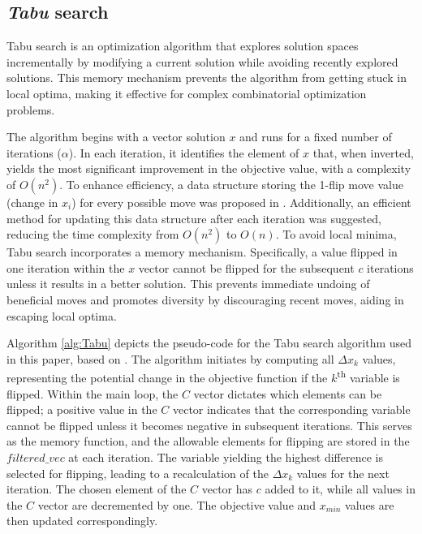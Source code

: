 \vspace{-8pt}
\subsection{\textit{Tabu} search}
Tabu search is an optimization algorithm that explores solution spaces incrementally by modifying a current solution while avoiding recently explored solutions. This memory mechanism prevents the algorithm from getting stuck in local optima, making it effective for complex combinatorial optimization problems. 

The algorithm begins with a vector solution $x$ and runs for a fixed number of iterations ($\alpha$). In each iteration, it identifies the element of $x$ that, when inverted, yields the most significant improvement in the objective value, with a complexity of $O(n^2)$. To enhance efficiency, a data structure storing the 1-flip move value (change in $x_i$) for every possible move was proposed in \cite{ref1}. Additionally, an efficient method for updating this data structure after each iteration was suggested, reducing the time complexity from $O(n^2)$ to $O(n)$. To avoid local minima, Tabu search incorporates a memory mechanism. Specifically, a value flipped in one iteration within the $x$ vector cannot be flipped for the subsequent $c$ iterations unless it results in a better solution. This prevents immediate undoing of beneficial moves and promotes diversity by discouraging recent moves, aiding in escaping local optima.

Algorithm \ref{alg:Tabu} depicts the pseudo-code for the Tabu search algorithm used in this paper, based on \cite{ref1}. The algorithm initiates by computing all $\Delta x_{k}$ values, representing the potential change in the objective function if the $k$\textsuperscript{th} variable is flipped. Within the main loop, the $C$ vector dictates which elements can be flipped; a positive value in the $C$ vector indicates that the corresponding variable cannot be flipped unless it becomes negative in subsequent iterations. This serves as the memory function, and the allowable elements for flipping are stored in the $filtered\_vec$ at each iteration. The variable yielding the highest difference is selected for flipping, leading to a recalculation of the $\Delta x_{k}$ values for the next iteration. The chosen element of the $C$ vector has $c$ added to it, while all values in the $C$ vector are decremented by one. The objective value and $x_{min}$ values are then updated correspondingly.


